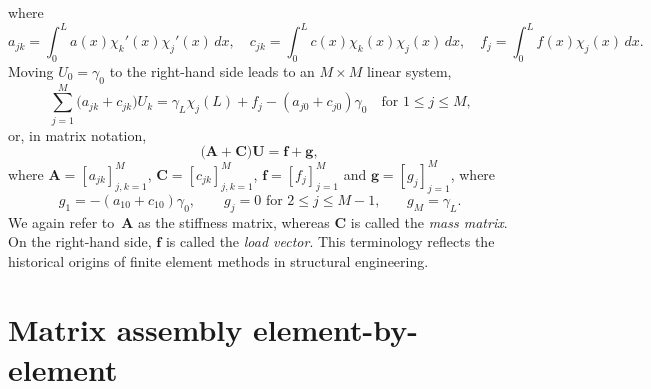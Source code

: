 where
\[
a_{jk}=\int_0^La(x)\chi_k'(x)\chi_j'(x)\,dx,\quad
c_{jk}=\int_0^Lc(x)\chi_k(x)\chi_j(x)\,dx,\quad
f_j=\int_0^Lf(x)\chi_j(x)\,dx.
\]
Moving $U_0=\gamma_0$ to the right-hand side leads to an $M\times M$ linear 
system,
\[
\sum_{j=1}^M\bigl(a_{jk}+c_{jk})U_k
    =\gamma_L\chi_j(L)+f_j-(a_{j0}+c_{j0})\gamma_0
    \quad\text{for $1\le j\le M$,}
\]
or, in matrix notation,
\begin{equation}\label{eq: self-adjoint mixed equations}
\bigl(\boldsymbol{A}+\boldsymbol{C}\bigr)\boldsymbol{U}
    =\boldsymbol{f}+\boldsymbol{g},
\end{equation}
where $\boldsymbol{A}=[a_{jk}]_{j,k=1}^M$, $\boldsymbol{C}=[c_{jk}]_{j,k=1}^M$,
$\boldsymbol{f}=[f_j]_{j=1}^M$ and $\boldsymbol{g}=[g_j]_{j=1}^M$, where
\[
g_1=-(a_{10}+c_{10})\gamma_0,\qquad
\text{$g_j=0$ for $2\le j\le M-1$,}\qquad
g_M=\gamma_L.
\]
We again refer to~$\boldsymbol{A}$ as the stiffness matrix, whereas 
$\boldsymbol{C}$ is called the \emph{mass matrix}.  On the right-hand side, 
$\boldsymbol{f}$ is called the \emph{load vector}.  This terminology reflects 
the historical origins of finite element methods in structural engineering.

\section{Matrix assembly element-by-element}

